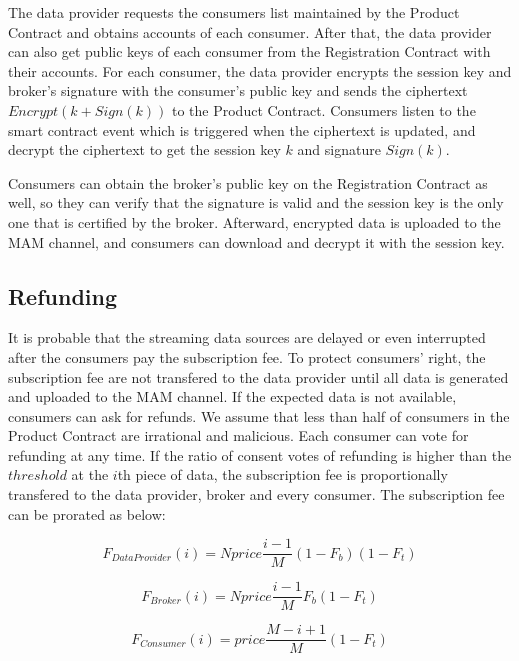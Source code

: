 \documentclass[journal,10pt,a4paper]{IEEEtran}
\begin{document}
The data provider requests the consumers list maintained by the Product Contract and obtains accounts of each consumer. After that, the data provider can also get public keys of each consumer from the Registration Contract with their accounts. For each consumer, the data provider encrypts the session key and broker's signature with the consumer's public key and sends the ciphertext $Encrypt(k + Sign(k))$ to the Product Contract. Consumers listen to the smart contract event which is triggered when the ciphertext is updated, and decrypt the ciphertext to get the session key $k$ and signature $Sign(k)$.

Consumers can obtain the broker's public key on the Registration Contract as well, so they can verify that the signature is valid and the session key is the only one that is certified by the broker. Afterward, encrypted data is uploaded to the MAM channel, and consumers can download and decrypt it with the session key.

\subsection{Refunding}
It is probable that the streaming data sources are delayed or even interrupted after the consumers pay the subscription fee. To protect consumers' right, the subscription fee are not transfered to the data provider until all data is generated and uploaded to the MAM channel. If the expected data is not available, consumers can ask for refunds. We assume that less than half of consumers in the Product Contract are irrational and malicious. Each consumer can vote for refunding at any time. If the ratio of consent votes of refunding is higher than the $threshold$ at the $i$th piece of data, the subscription fee is proportionally transfered to the data provider, broker and every consumer. The subscription fee can be prorated as below:

\begin{equation}
    F_{DataProvider}(i) = N price \frac{i-1}{M} (1-F_{b}) (1-F_{t})
\end{equation}

\begin{equation}
    F_{Broker}(i) = N price \frac{i-1}{M} F_{b} (1-F_{t})
\end{equation}

\begin{equation}
    F_{Consumer}(i) = price \frac{M-i+1}{M} (1-F_{t})
\end{equation}
\end{document}
